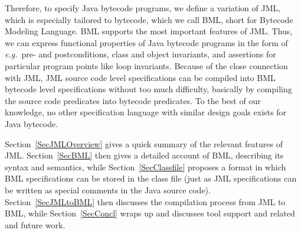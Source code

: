 Therefore, to specify Java bytecode programs, we define a variation of
JML, which is especially tailored to bytecode, which we call BML,
short for Bytecode Modeling Language.  BML supports the most important
features of JML. Thus, we can express functional properties of Java
bytecode programs in the form of \emph{e.g.}\ pre- and postconditions,
class and object invariants, and assertions for particular program
points like loop invariants. Because of the close connection with JML,
JML source code level specifications can be compiled into BML bytecode
level specifications without too much difficulty, basically by
compiling the source code predicates into bytecode predicates.  To the
best of our knowledge, no other specification language with similar
design goals exists for Java bytecode.

Section~\ref{SecJMLOverview} gives a quick summary of the relevant
features of JML. Section~\ref{SecBML} then gives a detailed account of
BML, describing its syntax and semantics, while
Section~\ref{SecClassfile} proposes a format in which BML
specifications can be stored in the class file (just as JML
specifications can be written as special comments in the Java source
code). Section~\ref{SecJMLtoBML} then discusses the compilation
process from JML to BML, while Section~\ref{SecConcl} wraps up and
discusses tool support and related and future work.


